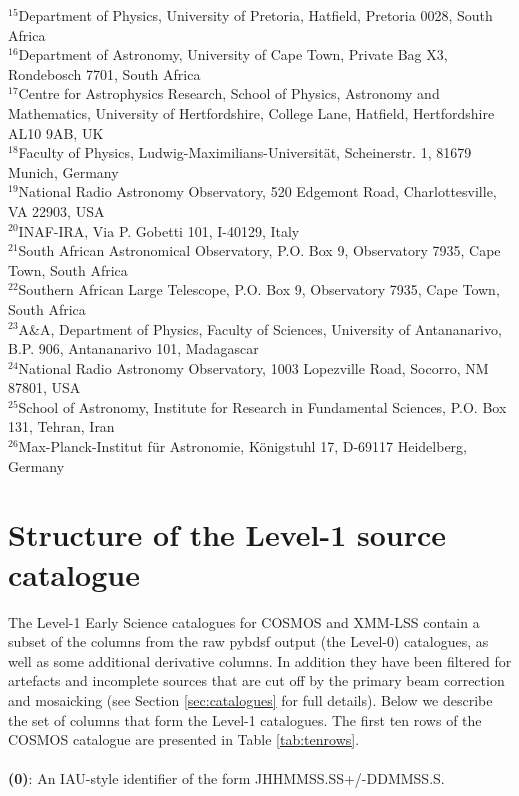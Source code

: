 \documentclass[usenatbib,usedcolumn]{mnras}
\begin{document}
$^{15}$Department of Physics, University of Pretoria, Hatfield, Pretoria 0028, South Africa\\
$^{16}$Department of Astronomy, University of Cape Town, Private Bag X3, Rondebosch 7701, South Africa\\
$^{17}$Centre for Astrophysics Research, School of Physics, Astronomy and Mathematics, University of Hertfordshire, College Lane, Hatfield, Hertfordshire AL10 9AB, UK\\
$^{18}$Faculty of Physics, Ludwig-Maximilians-Universit{\"a}t, Scheinerstr. 1, 81679 Munich, Germany\\
$^{19}$National Radio Astronomy Observatory, 520 Edgemont Road, Charlottesville, VA 22903, USA\\
$^{20}$INAF-IRA, Via P. Gobetti 101, I-40129, Italy\\
$^{21}$South African Astronomical Observatory, P.O. Box 9, Observatory 7935, Cape Town, South Africa\\
$^{22}$Southern African Large Telescope, P.O. Box 9, Observatory 7935, Cape Town, South Africa\\
$^{23}$A\&A, Department of Physics, Faculty of Sciences, University of Antananarivo, B.P. 906, Antananarivo 101, Madagascar\\
$^{24}$National Radio Astronomy Observatory, 1003 Lopezville Road, Socorro, NM 87801, USA\\
$^{25}$School of Astronomy, Institute for Research in Fundamental Sciences, P.O. Box 131, Tehran, Iran\\
$^{26}$Max-Planck-Institut f{\"u}r Astronomie, K{\"o}nigstuhl 17, D-69117 Heidelberg, Germany





\appendix 

\section{Structure of the Level-1 source catalogue}
\label{sec:cataloguestructure}

The Level-1 Early Science catalogues for COSMOS and XMM-LSS contain a subset of the columns from the raw {\sc pybdsf} output (the Level-0) catalogues, as well as some additional derivative columns. In addition they have been filtered for artefacts and incomplete sources that are cut off by the primary beam correction and mosaicking (see Section \ref{sec:catalogues} for full details). Below we describe the set of columns that form the Level-1 catalogues. The first ten rows of the COSMOS catalogue are presented in Table \ref{tab:tenrows}.\\
\\
\noindent
{\bf (0)}: An IAU-style identifier of the form JHHMMSS.SS+/-DDMMSS.S.
\\
\end{document}
